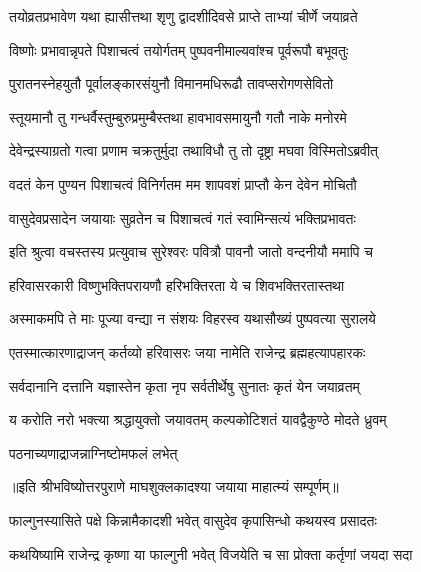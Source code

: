 \twolineshloka
{तयोव्रतप्रभावेण यथा ह्यासीत्तथा शृणु}
{द्वादशीदिवसे प्राप्ते ताभ्यां चीर्णे जयाव्रते} %

\twolineshloka
{विष्णोः प्रभावान्नृपते पिशाचत्वं तयोर्गतम्}
{पुष्पवनीमाल्यवांश्च पूर्वरूपौ बभूवतुः} %

\twolineshloka
{पुरातनस्नेहयुतौ पूर्वालङ्कारसंयुनौ}
{विमानमधिरूढौ तावप्सरोगणसेवितो} %

\twolineshloka
{स्तूयमानौ तु गन्धर्वैस्तुम्बुरुप्रमुम्बैस्तथा}
{हावभावसमायुनौ गतौ नाके मनोरमे} %

\twolineshloka
{देवेन्द्रस्याग्रतो गत्वा प्रणाम चक्रतुर्मुदा}
{तथाविधौ तु तो दृष्ट्रा मघवा विस्मितोऽब्रवीत्} %


\twolineshloka
{वदतं केन पुण्यन पिशाचत्वं विनिर्गतम}
{मम शापवशं प्राप्तौ केन देवेन मोचितौ} %


\twolineshloka
{वासुदेवप्रसादेन जयायाः सुव्रतेन च}
{पिशाचत्वं गतं स्वामिन्सत्यं भक्तिप्रभावतः} %

\twolineshloka
{इति श्रुत्वा वचस्तस्य प्रत्युवाच सुरेश्वरः}
{पवित्रौ पावनौ जातो वन्दनीयौ ममापि च} %

\twolineshloka
{हरिवासरकारी विष्णुभक्तिपरायणौ}
{हरिभक्तिरता ये च शिवभक्तिरतास्तथा} %

\twolineshloka
{अस्माकमपि ते माः पूज्या वन्द्या न संशयः}
{विहरस्व यथासौख्यं पुष्पवत्या सुरालये} %

\twolineshloka
{एतस्मात्कारणाद्राजन् कर्तव्यो हरिवासरः}
{जया नामेति राजेन्द्र ब्रह्महत्यापहारकः} %

\twolineshloka
{सर्वदानानि दत्तानि यज्ञास्तेन कृता नृप}
{सर्वतीर्थेषु सुनातः कृतं येन जयाव्रतम्} %

\twolineshloka
{य करोति नरो भक्त्या श्रद्धायुक्तो जयावतम्}
{कल्पकोटिशतं यावद्वैकुण्ठे मोदते ध्रुवम्} %

\onelineshloka
{पठनाच्यणाद्राजन्नाग्निष्टोमफलं लभेत्} %

॥इति श्रीभविष्योत्तरपुराणे माघशुक्लकादश्या जयाया माहात्म्यं सम्पूर्णम्॥



\twolineshloka
{फाल्गुनस्यासिते पक्षे किन्नामैकादशी भवेत्}
{वासुदेव कृपासिन्धो कथयस्व प्रसादतः} %


\twolineshloka
{कथयिष्यामि राजेन्द्र कृष्णा या फाल्गुनी भवेत्}
{विजयेति च सा प्रोक्ता कर्तृणां जयदा सदा} %

